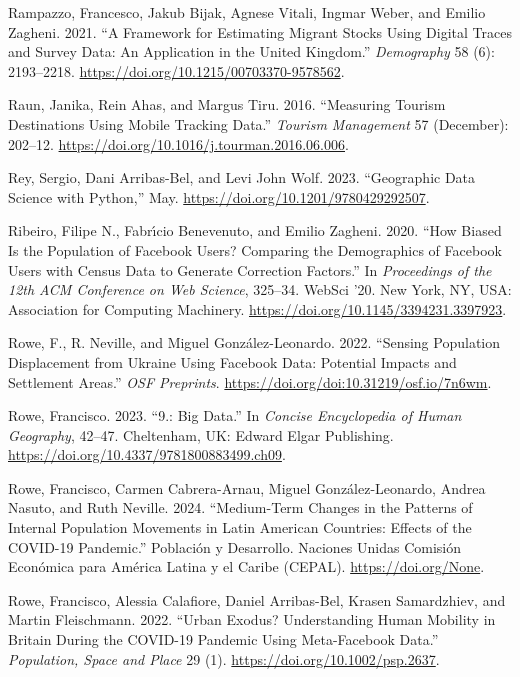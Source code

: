 \documentclass{article}
\newlength{\cslhangindent}
\newenvironment{CSLReferences}[2] %
 {\begin{list}{}{%
  \setlength{\itemindent}{0pt}
  \setlength{\leftmargin}{0pt}
  \setlength{\parsep}{0pt}
  \ifodd #1
   \setlength{\leftmargin}{\cslhangindent}
   \setlength{\itemindent}{-1\cslhangindent}
  \fi
  \setlength{\itemsep}{#2\baselineskip}}}
 {\end{list}}
\begin{document}
\begin{CSLReferences}{1}{0}
Rampazzo, Francesco, Jakub Bijak, Agnese Vitali, Ingmar Weber, and Emilio Zagheni. 2021. {``A Framework for Estimating Migrant Stocks Using Digital Traces and Survey Data: An Application in the United Kingdom.''} \emph{Demography} 58 (6): 2193--2218. \url{https://doi.org/10.1215/00703370-9578562}.

Raun, Janika, Rein Ahas, and Margus Tiru. 2016. {``Measuring Tourism Destinations Using Mobile Tracking Data.''} \emph{Tourism Management} 57 (December): 202--12. \url{https://doi.org/10.1016/j.tourman.2016.06.006}.

Rey, Sergio, Dani Arribas-Bel, and Levi John Wolf. 2023. {``Geographic Data Science with Python,''} May. \url{https://doi.org/10.1201/9780429292507}.

Ribeiro, Filipe N., Fabrı́cio Benevenuto, and Emilio Zagheni. 2020. {``How Biased Is the Population of Facebook Users? Comparing the Demographics of Facebook Users with Census Data to Generate Correction Factors.''} In \emph{Proceedings of the 12th ACM Conference on Web Science}, 325--34. WebSci '20. New York, NY, USA: Association for Computing Machinery. \url{https://doi.org/10.1145/3394231.3397923}.

Rowe, F., R. Neville, and Miguel González-Leonardo. 2022. {``Sensing Population Displacement from Ukraine Using Facebook Data: Potential Impacts and Settlement Areas.''} \emph{OSF Preprints}. \url{https://doi.org/doi:10.31219/osf.io/7n6wm}.

Rowe, Francisco. 2023. {``9.: Big Data.''} In \emph{Concise Encyclopedia of Human Geography}, 42--47. Cheltenham, UK: Edward Elgar Publishing. \url{https://doi.org/10.4337/9781800883499.ch09}.

Rowe, Francisco, Carmen Cabrera-Arnau, Miguel González-Leonardo, Andrea Nasuto, and Ruth Neville. 2024. {``Medium-Term Changes in the Patterns of Internal Population Movements in Latin American Countries: Effects of the COVID-19 Pandemic.''} Población y Desarrollo. Naciones Unidas Comisión Económica para América Latina y el Caribe (CEPAL). \url{https://doi.org/None}.

Rowe, Francisco, Alessia Calafiore, Daniel Arribas-Bel, Krasen Samardzhiev, and Martin Fleischmann. 2022. {``Urban Exodus? Understanding Human Mobility in Britain During the COVID{-}19 Pandemic Using Meta{-}Facebook Data.''} \emph{Population, Space and Place} 29 (1). \url{https://doi.org/10.1002/psp.2637}.


\end{CSLReferences}
\end{document}

